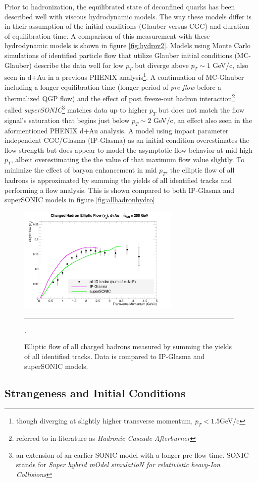 Prior to hadronization, the equilibrated state of deconfined quarks has been described well with viscous hydrodynamic models. The way these models differ is in their assumption of the initial conditions (Glauber versus CGC) and duration of equilibration time. A comparison of this measurement with these hydrodynamic models is shown in figure \ref{fig:hydrov2}. Models using Monte Carlo simulations of identified particle flow that utilize Glauber initial conditions (MC-Glauber) describe the data well for low $p_T$ but diverge above $p_T \sim 1$ GeV/c, also seen in d+Au in a previous PHENIX analysis\citep{Adare:2014keg}\footnote{though diverging at slightly higher transverse momentum, $p_T < 1.5 $GeV/c}. A continuation of MC-Glauber including a longer equilibration time (longer period of \textit{pre-flow} before a thermalized QGP flow) and the effect of post freeze-out hadron interaction\footnote{referred to in literature as \textit{Hadronic Cascade Afterburner}} called \textit{superSONIC}\citep{Romatschke2015}\footnote{an extension of an earlier SONIC model with a longer pre-flow time. SONIC stands for \textit{Super hybrid mOdel simulatioN for relativistic heavy-Ion Collisions}\citep{Romatschke2015}} matches data up to higher $p_T$ but does not match the flow signal's saturation that begins just below $p_T \sim 2$ GeV/c, an effect also seen in the aformentioned PHENIX d+Au analysis. A model using impact parameter independent CGC/Glasma (IP-Glasma)\citep{Schenke:2014gaa} as an initial condition overestimates the flow strength but does appear to model the asymptotic flow behavior at mid-high $p_T$, albeit overestimating the the value of that maximum flow value slightly. To minimize the effect of baryon enhancement in mid $p_T$, the elliptic flow of all hadrons is approximated by summing the yields of all identified tracks and performing a flow analysis. This is shown compared to both IP-Glasma and superSONIC models in figure \ref{fig:allhadronhydro}
\begin{figure}[hbtp]
\centering    
    \includegraphics[width=0.7\textwidth]{results/v2hydro.jpg}
    \rule{35em}{0.5pt}
    \caption[Elliptic flow of all charged hadrons compared to hydrodynamic models.]{Elliptic flow of all charged hadrons measured by summing the yields of all identified tracks. Data is compared to IP-Glasma and superSONIC models.}.
    \label{fig:fig:allhadronhydro}
\end{figure}

\subsection{Strangeness and Initial Conditions}





\pagebreak
\pagebreak


